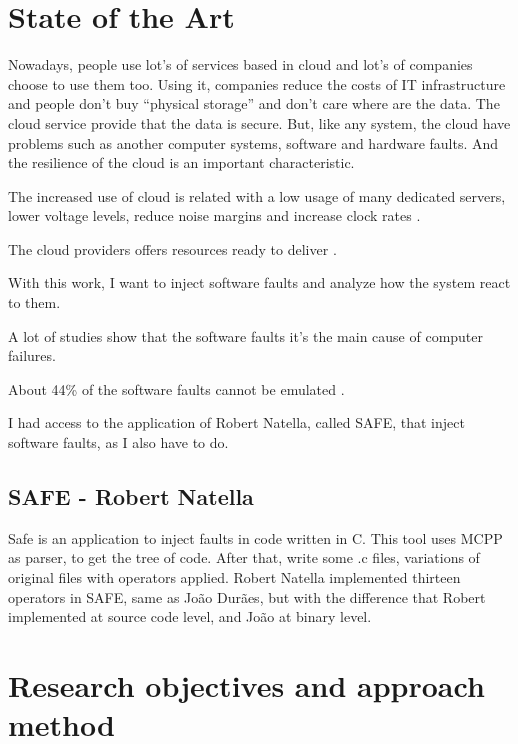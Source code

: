 \newpage
\section{State of the Art}

Nowadays, people use lot's of services based in cloud and lot's of companies choose to use them too. Using it, companies reduce the costs of IT infrastructure and people don't buy ``physical storage'' and don't care where are the data. The cloud service provide that the data is secure.
But, like any system, the cloud have problems such as another computer systems, software and hardware faults. And the resilience of the cloud is an important characteristic.

The increased use of cloud is related with a low usage of many dedicated servers, lower voltage levels, reduce noise margins and increase clock rates \cite{wolter2012resilience}.

The cloud providers offers resources ready to deliver \cite{wolter2012resilience}.

With this work, I want to inject software faults and analyze how the system react to them.

A lot of studies show that the software faults\cite{avizzienisbasic} it's the main cause of computer failures.


About 44\% of the software faults cannot be emulated \cite{madeira2000emulation}.


I had access to the application of Robert Natella, called SAFE, that inject software faults, as I also have to do.

\subsection{SAFE - Robert Natella}
Safe is an application to inject faults in code written in C. This tool uses MCPP as parser, to get the tree of code. After that, write some .c files, variations of original files with operators applied. Robert Natella implemented thirteen operators in SAFE, same as João Durães\cite{duraes2006emulation}, but with the difference that Robert implemented at source code level, and João at binary level.



\newpage
\section{Research objectives and approach method}

